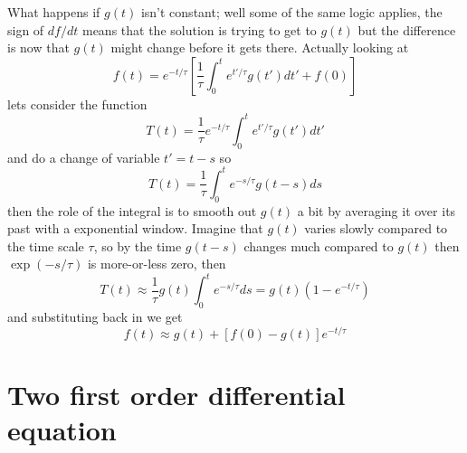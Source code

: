 \documentclass{article}
\begin{document}
What happens if $g(t)$ isn't constant; well some of the same logic applies, the sign of $df/dt$ means that the solution is trying to get to $g(t)$ but the difference is now that $g(t)$ might change before it gets there. Actually looking at 
\begin{equation}
f(t)=e^{-t/\tau}\left[\frac{1}{\tau}\int_0^t e^{t'/\tau} g(t')dt'+f(0)\right]
\end{equation}
lets consider the function
\begin{equation}
T(t)=\frac{1}{\tau}e^{-t/\tau}\int_0^t e^{t'/\tau} g(t')dt'
\end{equation}
and do a change of variable $t'=t-s$ so 
\begin{equation}
T(t)=\frac{1}{\tau}\int_0^t e^{-s/\tau} g(t-s)ds
\end{equation}
then the role of the integral is to smooth out $g(t)$ a bit by averaging it over its past with a exponential window. Imagine that $g(t)$ varies slowly compared to the time scale $\tau$, so by the time $g(t-s)$ changes much compared to $g(t)$ then $\exp(-s/\tau)$ is more-or-less zero, then
\begin{equation}
T(t)\approx\frac{1}{\tau}g(t)\int_0^t e^{-s/\tau}ds=g(t)\left(1-e^{-t/\tau}\right)
\end{equation}
and substituting back in we get
\begin{equation}
f(t)\approx g(t)+[f(0)-g(t)]e^{-t/\tau}
\end{equation}

\section*{Two first order differential equation}
\end{document}
